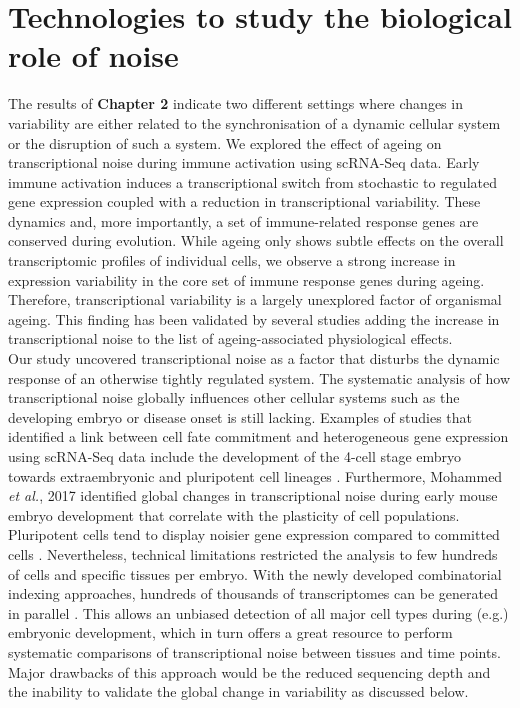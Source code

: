 \newpage

\section{Technologies to study the biological role of noise}

The results of \textbf{Chapter 2} indicate two different settings where changes in variability are either related to the synchronisation of a dynamic cellular system or the disruption of such a system. We explored the effect of ageing on transcriptional noise during immune activation using scRNA-Seq data. Early immune activation induces a transcriptional switch from stochastic to regulated gene expression coupled with a reduction in transcriptional variability. These dynamics and, more importantly, a set of immune-related response genes are conserved during evolution. While ageing only shows subtle effects on the overall transcriptomic profiles of individual cells, we observe a strong increase in expression variability in the core set of immune response genes during ageing. Therefore, transcriptional variability is a largely unexplored factor of organismal ageing. This finding has been validated by several studies \citep{Enge2017, Angelidis2018, Cheung2018} adding the increase in transcriptional noise to the list of ageing-associated physiological effects.\\

Our study uncovered transcriptional noise as a factor that disturbs the dynamic response of an otherwise tightly regulated system. The systematic analysis of how transcriptional noise globally influences other cellular systems such as the developing embryo or disease onset is still lacking. Examples of studies that identified a link between cell fate commitment and heterogeneous gene expression using scRNA-Seq data include the development of the 4-cell stage embryo towards extraembryonic and pluripotent cell lineages \citep{Goolam2016}. Furthermore, Mohammed \emph{et al.}, 2017 identified global changes in transcriptional noise during early mouse embryo development that correlate with the plasticity of cell populations. Pluripotent cells tend to display noisier gene expression compared to committed cells \citep{Mohammed2017}. Nevertheless, technical limitations restricted the analysis to few hundreds of cells and specific tissues per embryo. With the newly developed combinatorial indexing approaches, hundreds of thousands of transcriptomes can be generated in parallel \citep{Cao2017}. This allows an unbiased detection of all major cell types during (e.g.) embryonic development, which in turn offers a great resource to perform systematic comparisons of transcriptional noise between tissues and time points. Major drawbacks of this approach would be the reduced sequencing depth and the inability to validate the global change in variability as discussed below.\\

